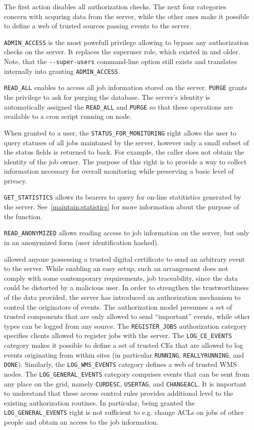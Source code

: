 The first action disables all authorization checks. The next four categories concern with acquring data from the \LB
server, while the other ones make it possible to define a web of trusted sources
passing events to the \LB server.

\verb'ADMIN_ACCESS' is the most powefull privilege allowing to bypass any
authorization checks on the server. It replaces the superuser role, which
existed in  and older. Note, that the \verb'--super-users'
command-line option still exists and translates internally into granting
\verb'ADMIN_ACCESS'.

\verb'READ_ALL' enables to access all job information stored on the server.
\verb'PURGE' grants the privilege to ask for purging the \LB database.  The \LB
server's identity is automatically assigned the \verb'READ_ALL' and
\verb'PURGE' so that these operations are available \eg to a cron script
running on \LB node.

When granted to a user, the \verb'STATUS_FOR_MONITORING' right allows the user to
query statuses of all jobs maintaned by the server, however only a small
subset of the status fields is returned to back. For example, the caller
does not obtain the identity of the job owner. The purpose of this right is
to provide a way to collect information necessary for overall monitoring
while preserving a basic level of privacy.

\verb'GET_STATISTICS' allows its bearers to query for on-line statitistics
generated by the \LB server. See~\ref{maintain:statistics} for more
information about the purpose of the function.

\verb'READ_ANONYMIZED' allows reading access to job information on the server,
but only in an anonymized form (user identification hashed).

 allowed anyone possessing a trusted digital certificate to send an
arbitrary event to the \LB server. While enabling an easy setup, such an
arrangement does not comply with some contemporary requirements, \eg job
traceability, since the data could be distorted by a malicious user.  In order
to strengthen the trustworthiness of the data provided, the 
server has introduced an authorization mechanism to control the originators
of events.  The authorization model presumes a set of trusted components
that are only allowed to send ``important'' events, while other types can be
logged from any source. The \verb'REGISTER_JOBS' authorization category
specifies clients allowed to register jobs with the \LB server. The
\verb'LOG_CE_EVENTS' category makes it possible to define a set of trusted
CEs that are allowed to log events originating from within sites (in
particular \verb'RUNNING', \verb'REALLYRUNNING', and \verb'DONE').
Similarly, the \verb'LOG_WMS_EVENTS' category defines a web of trusted WMS
nodes. The \verb'LOG_GENERAL_EVENTS' category comprises events that can be
sent from any place on the grid, namely \verb'CURDESC', \verb'USERTAG', and
\verb'CHANGEACL'. It is important to understand that these access control
rules provides additional level to the existing authorization routines.
In particular, being granted the \verb'LOG_GENERAL_EVENTS' right is not sufficient to
e.g. change ACLs on jobs of other people and obtain an access to the job information.

